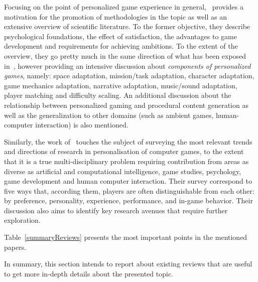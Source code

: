 Focusing on the point of personalized game experience in general,~\cite{bakkes_personalised_2012} provides a motivation for the promotion of methodologies in the topic as well as an extensive overview of scientific literature. To the former objective, they describe psychological foundations, the effect of satisfaction, the advantages to game development and requirements for achieving ambitions. To the extent of the overview, they go pretty much in the same direction of what has been exposed in~\cite{bakkes_player_2012}, however providing an intensive discussion about \textit{components of personalized games}, namely: space adaptation, mission/task adaptation, character adaptation, game mechanics adaptation, narrative adaptation, music/sound adaptation, player matching and difficulty scaling. An additional discussion about the relationship between personalized gaming and procedural content generation as well as the generalization to other domains (such as ambient games, human-computer interaction) is also mentioned.

Similarly, the work of~\cite{karpinskyj_video_2014} touches the subject of surveying the most relevant trends and directions of research in personalisation of computer games, to the extent that it is a true multi-disciplinary problem requiring contribution from areas as diverse as artificial and computational intelligence, game studies, psychology, game development and human computer interaction. Their survey correspond to five ways that, according them, players are often distinguishable from each other: by preference, personality, experience, performance, and in-game behavior. Their discussion also aims to identify key research avenues that require further exploration.  

Table~\ref{summaryReviews} presents the most important points in the mentioned papers. 

In summary, this section intends to report about existing reviews that are useful to get more in-depth details about the presented topic.


